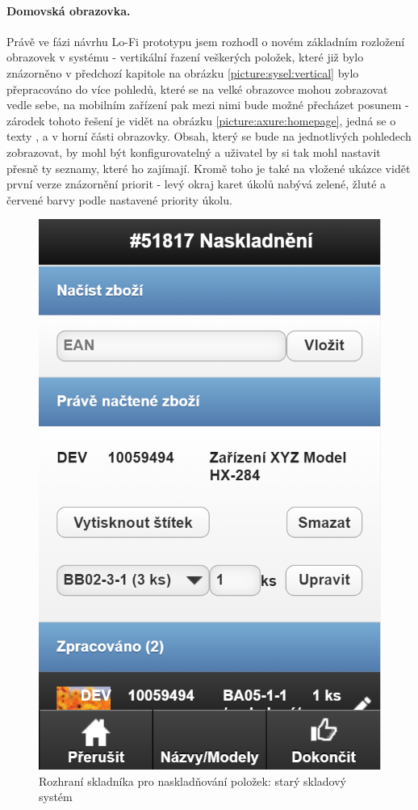 \paragraph{Domovská obrazovka.} Právě ve fázi návrhu Lo-Fi prototypu jsem rozhodl o novém základním rozložení obrazovek v systému - vertikální řazení veškerých položek, které již bylo znázorněno v předchozí kapitole na obrázku \ref{picture:sysel:vertical} bylo přepracováno do více pohledů, které se na velké obrazovce mohou zobrazovat vedle sebe, na mobilním zařízení pak mezi nimi bude možné přecházet posunem - zárodek tohoto řešení je vidět na obrázku \ref{picture:axure:homepage}, jedná se o texty ,  a  v horní části obrazovky. Obsah, který se bude na jednotlivých pohledech zobrazovat, by mohl být konfigurovatelný a uživatel by si tak mohl nastavit přesně ty seznamy, které ho zajímají. Kromě toho je také na vložené ukázce vidět první verze znázornění priorit - levý okraj karet úkolů nabývá zelené, žluté a červené barvy podle nastavené priority úkolu.

\begin{figure}[h]
\includegraphics[height=0.6\textheight]{../png/sysel/naskladneni.png}
\caption{Rozhraní skladníka pro naskladňování položek: starý skladový systém} \label{picture:sysel:naskladneni}
\end{figure}

